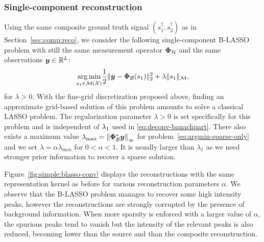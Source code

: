 \documentclass[12pt]{article}
\begin{document}
        \subsubsection{Single-component reconstruction}
        Using the same composite ground truth signal $(s_1^\dagger, s_2^\dagger)$ as in Section~\ref{sec:comp:reco}, we consider the following single-component B-LASSO problem with still the same measurement operator $\bm{\Phi}_\mathcal{H}$ and the same observations $\bm{y}\in\mathbb{R}^L$:
        \begin{equation}
            \label{eq:argmin-sparse-only}
            \underset{s_1 \in {\mathcal{M}}({\mathcal{X}})}{\arg\min} \frac{1}{2} \| \bm{y} - \bm{\Phi}_\mathcal{B} (s_1) \|_2^2  + \lambda \| s_1 \|_{\mathcal{M}},
        \end{equation}
        for $\lambda > 0$.
        With the fine-grid discretization proposed above, finding an approximate grid-based solution of this problem amounts to solve a classical LASSO problem. The regularization parameter $\lambda > 0$ is set specifically for this problem and is independent of $\lambda_{1}$ used in \eqref{eq:deconv-banachpart}. There also exists a maximum value $\lambda_\mathrm{max} = \left\lVert\bm{\Phi}_\mathcal{B}^*\bm{y}\right\rVert_\infty$ for problem~\eqref{eq:argmin-sparse-only} and we set $\lambda = \alpha \lambda_\mathrm{max}$ for $0 < \alpha < 1$. It is usually larger than $\lambda_1$ as we need stronger prior information to recover a sparse solution.
        
        Figure~\ref{fig:simple:blasso-conv} displays the reconstructions with the same representation kernel as before for various reconstruction parameters $\alpha$.
        We observe that the B-LASSO problem manages to recover some high intensity peaks, however the reconstructions are strongly corrupted by the presence of background information. When more sparsity is enforced with a larger value of $\alpha$, the spurious peaks tend to vanish but the intensity of the relevant peaks is also reduced, becoming lower than the source and than the composite reconstruction.
\end{document}
